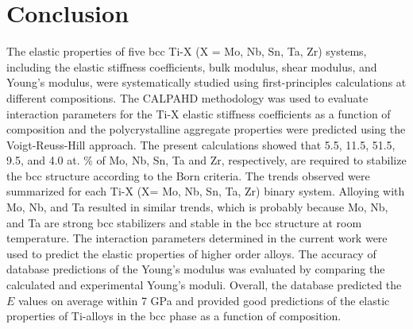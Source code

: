 \section{Conclusion}

The elastic properties of five bcc Ti-X (X = Mo, Nb, Sn, Ta, Zr) systems, including the elastic stiffness coefficients, bulk modulus, shear modulus, and Young's modulus, were systematically studied using first-principles calculations at different compositions. The CALPAHD methodology was used to evaluate interaction parameters for the Ti-X elastic stiffness coefficients as a function of composition and the polycrystalline aggregate properties were predicted using the Voigt-Reuss-Hill approach. The present calculations showed that 5.5, 11.5, 51.5, 9.5, and 4.0 at. \% of Mo, Nb, Sn, Ta and Zr, respectively, are required to stabilize the bcc structure according to the Born criteria. The trends observed were summarized for each Ti-X (X= Mo, Nb, Sn, Ta, Zr) binary system. Alloying with Mo, Nb, and Ta resulted in similar trends, which is probably because Mo, Nb, and Ta are strong bcc stabilizers and stable in the bcc structure at room temperature. The interaction parameters determined in the current work were used to predict the elastic properties of higher order alloys. The accuracy of database predictions of the Young's modulus was evaluated by comparing the calculated and experimental Young's moduli. Overall, the database predicted the $E$ values on average within 7 GPa and provided good predictions of the elastic properties of Ti-alloys in the bcc phase as a function of composition. 

